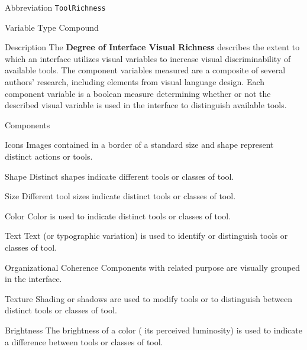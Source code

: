 \begin{AlignedDesc}
  \item[Abbreviation] \texttt{ToolRichness}

  \item[Variable Type] Compound

  \item[Description] The \textbf{Degree of Interface Visual Richness}
  describes the extent to which an interface utilizes visual variables to
  increase visual discriminability of available tools. The component
  variables measured are a composite of several authors' research,
  including elements from visual language design. Each component variable
  is a boolean measure determining whether or not the described visual
  variable is used in the interface to distinguish available tools.

  \item[Components]

  \begin{AlignedDesc}
    \item[Icons] Images contained in a border of a standard size and shape
    represent distinct actions or tools.~\cite{costagliola2002,moody2009}
    \item[Shape] Distinct shapes indicate different tools or classes of
    tool.~\cite{moody2009}
    \item[Size] Different tool sizes indicate distinct tools or classes
    of tool.~\cite{moody2009}
    \item[Color] Color is used to indicate distinct tools or classes of
    tool.~\cite{moody2009}
    \item[Text] Text (or typographic variation) is used to identify or
    distinguish tools or classes of tool.~\cite{moody2009}
    \item[Organizational Coherence] Components with related purpose are
    visually grouped in the interface.~\cite{constantine1996}
    \item[Texture] Shading or shadows are used to modify tools or to
    distinguish between distinct tools or classes of tool.~\cite{moody2009}
    \item[Brightness] The brightness of a color (\ie{} its perceived
    luminosity) is used to indicate a difference between tools or classes
    of tool.~\cite{moody2009}
  \end{AlignedDesc}

\end{AlignedDesc}


